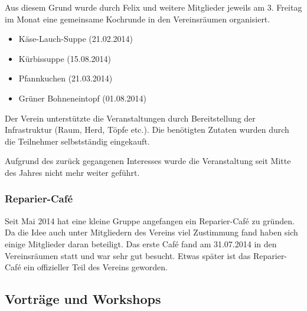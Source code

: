 \documentclass[ngerman]{scrartcl}
\begin{document}
Aus diesem Grund wurde durch Felix und weitere Mitglieder jeweils am 3. Freitag
im Monat eine gemeinsame Kochrunde in den Vereinsräumen organisiert.

\begin{itemize}
    \item Käse-Lauch-Suppe (21.02.2014)
    \item Kürbissuppe (15.08.2014)
    \item Pfannkuchen (21.03.2014)
    \item Grüner Bohneneintopf (01.08.2014)
\end{itemize}

Der Verein unterstützte die Veranstaltungen durch Bereitstellung der
Infrastruktur (Raum, Herd, Töpfe etc.). Die benötigten Zutaten wurden
durch die Teilnehmer selbstständig eingekauft. 

Aufgrund des zurück gegangenen Interesses wurde die Veranstaltung seit Mitte des Jahres nicht mehr weiter geführt. 

\subsubsection{Reparier-Café}

Seit Mai 2014 hat eine kleine Gruppe angefangen ein Reparier-Café zu gründen. 
Da die Idee auch unter Mitgliedern des Vereins viel Zustimmung fand haben sich einige Mitglieder daran beteiligt. 
Das erste Café fand am 31.07.2014 in den Vereinsräumen statt und war sehr gut besucht. 
Etwas später ist das Reparier-Café ein offizieller Teil des Vereins geworden. 


\subsection{Vorträge und Workshops}
\end{document}
